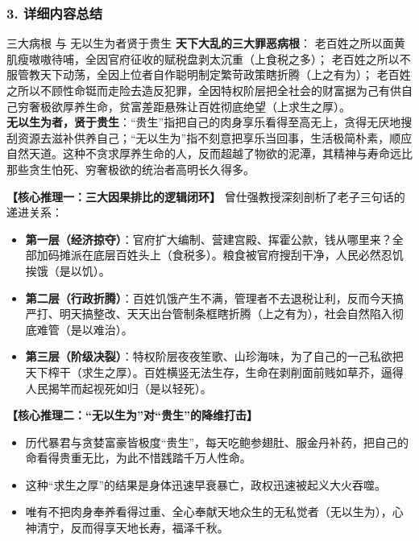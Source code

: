 \subsubsection{3. 详细内容总结}

\begin{ConceptBox}{三大病根 与 无以生为者贤于贵生}
\textbf{天下大乱的三大罪恶病根}：
老百姓之所以面黄肌瘦嗷嗷待哺，全因官府征收的赋税盘剥太沉重（上食税之多）；
老百姓之所以不服管教天下动荡，全因上位者自作聪明制定繁苛政策瞎折腾（上之有为）；
老百姓之所以不顾性命铤而走险去造反犯罪，全因特权阶层把全社会的财富据为己有供自己穷奢极欲厚养生命，贫富差距悬殊让百姓彻底绝望（上求生之厚）。\\
\textbf{无以生为者，贤于贵生}：“贵生”指把自己的肉身享乐看得至高无上，贪得无厌地搜刮资源去滋补供养自己；“无以生为”指不刻意把享乐当回事，生活极简朴素，顺应自然天道。这种不贪求厚养生命的人，反而超越了物欲的泥潭，其精神与寿命远比那些贪生怕死、穷奢极欲的统治者高明长久得多。
\end{ConceptBox}

\noindent\textbf{【核心推理一：三大因果排比的逻辑闭环】}
曾仕强教授深刻剖析了老子三句话的递进关系：
\begin{itemize}
    \item \textbf{第一层（经济掠夺）}：官府扩大编制、营建宫殿、挥霍公款，钱从哪里来？全部加码摊派在底层百姓头上（食税多）。粮食被官府搜刮干净，人民必然忍饥挨饿（是以饥）。
    \item \textbf{第二层（行政折腾）}：百姓饥饿产生不满，管理者不去退税让利，反而今天搞严打、明天搞整改、天天出台管制条框瞎折腾（上之有为），社会自然陷入彻底难管（是以难治）。
    \item \textbf{第三层（阶级决裂）}：特权阶层夜夜笙歌、山珍海味，为了自己的一己私欲把天下榨干（求生之厚）。百姓横竖无法生存，生命在剥削面前贱如草芥，逼得人民揭竿而起视死如归（是以轻死）。
\end{itemize}

\noindent\textbf{【核心推理二：“无以生为”对“贵生”的降维打击】}
\begin{itemize}
    \item 历代暴君与贪婪富豪皆极度“贵生”，每天吃鲍参翅肚、服金丹补药，把自己的命看得贵重无比，为此不惜践踏千万人性命。
    \item 这种“求生之厚”的结果是身体迅速早衰暴亡，政权迅速被起义大火吞噬。
    \item 唯有不把肉身奉养看得过重、全心奉献天地众生的无私觉者（无以生为），心神清宁，反而得享天地长寿，福泽千秋。
\end{itemize}

